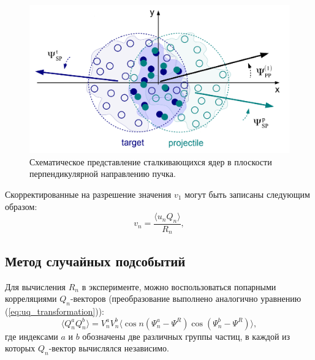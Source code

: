 %
\begin{figure}[ht]
\begin{center}
\includegraphics[width=0.75\linewidth]{images/v1_pp_sp.png}
\caption{Схематическое представление сталкивающихся ядер в плоскости перпендикулярной направлению пучка.}
\label{fig:pp_sp_rp}
\end{center}
\end{figure}
%

Скорректированные на разрешение значения $v_1$ могут быть записаны следующим образом: 
%
\begin{equation}
    v_n =  \frac{ \langle u_n Q_n \rangle }{R_n},
    \label{eq:v1_formula}
\end{equation}
%

\subsection{Метод случайных подсобытий}

Для вычисления $R_n$ в эксперименте, можно воспользоваться попарными корреляциями $Q_n$-векторов (преобразование выполнено аналогично уравнению (\ref{eq:uq_transformation})): 
%
\begin{equation}
    \langle Q_n^a Q_n^b \rangle = V^a_n V^b_n \langle \cos n (\Psi^a_n - \Psi^R) \cos(\Psi^b_n - \Psi^R) \rangle,
\end{equation}
%
где индексами $a$ и $b$ обозначены две различных группы частиц, в каждой из которых $Q_n$-вектор вычислялся независимо.

